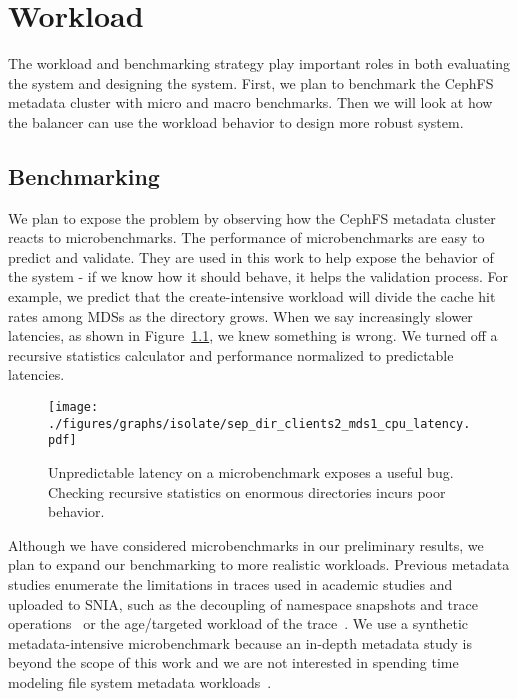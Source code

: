 \chapter{Workload}
\label{workload}
The workload and benchmarking strategy play important roles in both evaluating the system and designing the system. First, we plan to benchmark the CephFS metadata cluster with micro and macro benchmarks. Then we will look at how the balancer can use the workload behavior to design  more robust system.

\section{Benchmarking}
We plan to expose the problem by observing how the CephFS metadata cluster reacts to microbenchmarks. The performance of microbenchmarks are easy to predict and validate. They are used in this work to help expose the behavior of the system - if we know how it should behave, it helps the validation process. For example, we predict that the create-intensive workload will divide the cache hit rates among MDSs as the directory grows. When we say increasingly slower latencies, as shown in Figure~\ref{unpredictable-latency}, we knew something is wrong. We turned off a recursive statistics calculator and performance normalized to predictable latencies.

\begin{figure}[tbh]
	\centering
	\texttt{[image: ./figures/graphs/isolate/sep\_dir\_clients2\_mds1\_cpu\_latency.pdf]} 
	\caption{Unpredictable latency on a microbenchmark exposes a useful bug. Checking recursive statistics on enormous directories incurs poor behavior.\label{unpredictable-latency}}
\end{figure}
Although we have considered microbenchmarks in our preliminary results, we plan to expand our benchmarking to more realistic workloads. Previous metadata studies enumerate the limitations in traces used in academic studies and uploaded to SNIA, such as the decoupling of namespace snapshots and trace operations~\cite{abad:techreport2012-fstrace} or the age/targeted workload of the trace~\cite{leung:atc2008-nfs-trace}. We use a synthetic metadata-intensive microbenchmark because an in-depth metadata study is beyond the scope of this work and we are not interested in spending time modeling file system metadata workloads~\cite{abad:ucc2012-mimesis}.

